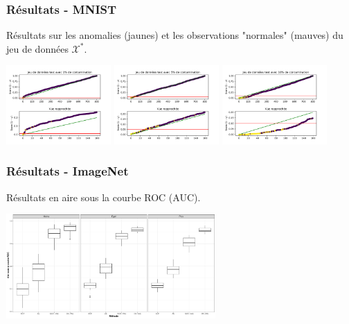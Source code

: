 \documentclass{beamer}
\begin{document}
	\begin{frame}
		\frametitle{Résultats -  MNIST}
		
		Résultats sur les anomalies (jaunes) et les observations "normales" (mauves) du jeu de données $\mathcal{X^*}$.
		
		\vspace{0.5cm}
		
		\centering
		\includegraphics[width=4cm]{../rapports/images/images_davae/pvalues_scenario3_moins}
		\includegraphics[width=4cm]{../rapports/images/images_davae/pvalues_scenario3_egal}
		\includegraphics[width=4cm]{../rapports/images/images_davae/pvalues_scenario3_plus}
		
	\end{frame}
	
	\begin{frame}
		\frametitle{Résultats -  ImageNet}
		
		Résultats en aire sous la courbe ROC (AUC).
		
		\vspace{0.5cm}
		
		\centering
		\includegraphics[width=8cm]{../rapports/images/images_boxplots/auc_cars.pdf}
		
	\end{frame}
\end{document}
